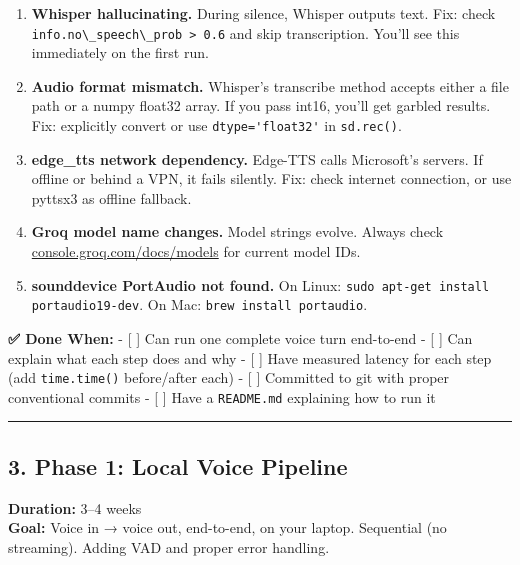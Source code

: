 \documentclass[
  11pt,
]{article}
\newcommand{\passthrough}[1]{#1}
\begin{document}
\begin{enumerate}
\def\labelenumi{\arabic{enumi}.}
\item
  \textbf{Whisper hallucinating.} During silence, Whisper outputs text.
  Fix: check \passthrough{\lstinline!info.no\_speech\_prob > 0.6!} and
  skip transcription. You'll see this immediately on the first run.
\item
  \textbf{Audio format mismatch.} Whisper's transcribe method accepts
  either a file path or a numpy float32 array. If you pass int16, you'll
  get garbled results. Fix: explicitly convert or use
  \passthrough{\lstinline!dtype='float32'!} in
  \passthrough{\lstinline!sd.rec()!}.
\item
  \textbf{edge\_tts network dependency.} Edge-TTS calls Microsoft's
  servers. If offline or behind a VPN, it fails silently. Fix: check
  internet connection, or use pyttsx3 as offline fallback.
\item
  \textbf{Groq model name changes.} Model strings evolve. Always check
  \href{https://console.groq.com/docs/models}{console.groq.com/docs/models}
  for current model IDs.
\item
  \textbf{sounddevice PortAudio not found.} On Linux:
  \passthrough{\lstinline!sudo apt-get install portaudio19-dev!}. On
  Mac: \passthrough{\lstinline!brew install portaudio!}.
\end{enumerate}

\textbf{✅ Done When:} - {[} {]} Can run one complete voice turn
end-to-end - {[} {]} Can explain what each step does and why - {[} {]}
Have measured latency for each step (add
\passthrough{\lstinline!time.time()!} before/after each) - {[} {]}
Committed to git with proper conventional commits - {[} {]} Have a
\passthrough{\lstinline!README.md!} explaining how to run it

\begin{center}\rule{0.5\linewidth}{0.5pt}\end{center}

\hypertarget{phase-1-local-voice-pipeline}{%
\subsection{3. Phase 1: Local Voice
Pipeline}\label{phase-1-local-voice-pipeline}}

\textbf{Duration:} 3--4 weeks\\
\textbf{Goal:} Voice in → voice out, end-to-end, on your laptop.
Sequential (no streaming). Adding VAD and proper error handling.
\end{document}
